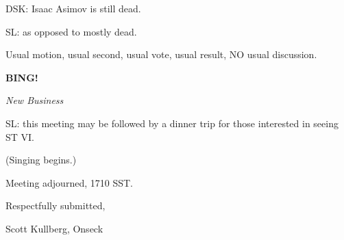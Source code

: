 \documentclass[12pt]{article}
\newcommand{\bing}{{\bf BING!} }
\newcommand{\goto}[1]{\bing \vskip 12pt \centerline{{\em{#1}}}}
\begin{document}
DSK: Isaac Asimov is still dead.

SL: as opposed to mostly dead.

Usual motion, usual second, usual vote, usual result, NO usual discussion.

\goto{New Business}

SL: this meeting may be followed by a dinner trip for those interested in seeing ST VI.

(Singing begins.)

\vspace{12pt}

\noindent
Meeting adjourned, 1710 SST.

\vspace{18pt}

\centerline{Respectfully submitted,}
\centerline{Scott Kullberg, Onseck}
\end{document}
